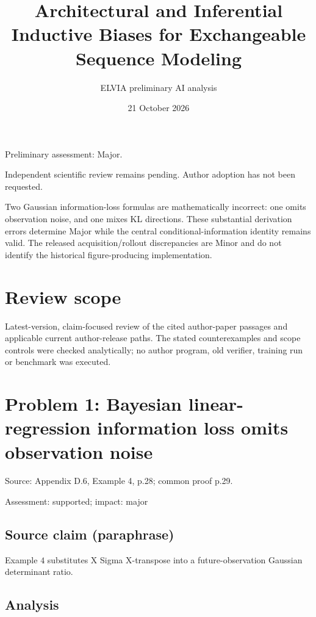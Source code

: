 \documentclass[11pt]{article}
\begin{document}
\title{Architectural and Inferential Inductive Biases for Exchangeable Sequence Modeling}

\author{ELVIA preliminary AI analysis}\date{21 October 2026}\maketitle

Preliminary assessment: Major.\par

Independent scientific review remains pending. Author adoption has not been requested.

Two Gaussian information-loss formulas are mathematically incorrect: one omits observation noise, and one mixes KL directions. These substantial derivation errors determine Major while the central conditional-information identity remains valid. The released acquisition/rollout discrepancies are Minor and do not identify the historical figure-producing implementation.

\section*{Review scope}

Latest-version, claim-focused review of the cited author-paper passages and applicable current author-release paths. The stated counterexamples and scope controls were checked analytically; no author program, old verifier, training run or benchmark was executed.

\section*{Problem 1: Bayesian linear-regression information loss omits observation noise}

Source: Appendix D.6, Example 4, p.28; common proof p.29.

Assessment: supported; impact: major

\subsection*{Source claim (paraphrase)}

Example \(4\) substitutes X Sigma X-transpose into a future-observation Gaussian determinant ratio.

\subsection*{Analysis}
\end{document}
